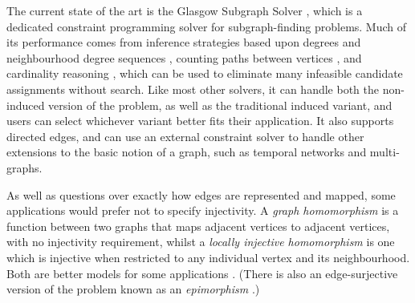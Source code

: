 \documentclass{article}
\begin{document}
The current state of the art is the Glasgow Subgraph Solver \cite{DBLP:conf/gg/McCreeshP020}, which
is a dedicated constraint programming solver for subgraph-finding problems. Much of its performance
comes from inference strategies based upon degrees and neighbourhood degree sequences
\cite{DBLP:journals/constraints/ZampelliDS10}, counting paths between vertices
\cite{DBLP:conf/cp/AudemardLMGP14,DBLP:conf/cp/McCreeshP15}, and cardinality reasoning
\cite{DBLP:journals/ai/Solnon10}, which can be used to eliminate many infeasible candidate
assignments without search. Like most other solvers, it can handle both the non-induced version of
the problem, as well as the traditional induced variant, and users can select whichever variant
better fits their application. It also supports directed edges, and can use an external constraint
solver to handle other extensions to the basic notion of a graph, such as temporal networks and
multi-graphs.

As well as questions over exactly how edges are represented and mapped, some applications would
prefer not to specify injectivity. A \emph{graph homomorphism} is a function between two graphs that
maps adjacent vertices to adjacent vertices, with no injectivity requirement, whilst a \emph{locally
injective homomorphism} is one which is injective when restricted to any individual vertex and its
neighbourhood. Both are better models for some applications
\cite{DBLP:journals/dam/FialaKK01,DBLP:conf/semweb/Baget05,DBLP:conf/iccs/CorbyF07,DBLP:journals/csr/FialaK08,DBLP:journals/pvldb/FanLMWW10,DBLP:journals/tcs/ChaplickFHPT15}.
(There is also an edge-surjective version of the problem known as an \emph{epimorphism}
\cite{DBLP:journals/dam/GayFMSS14}.)
\end{document}
